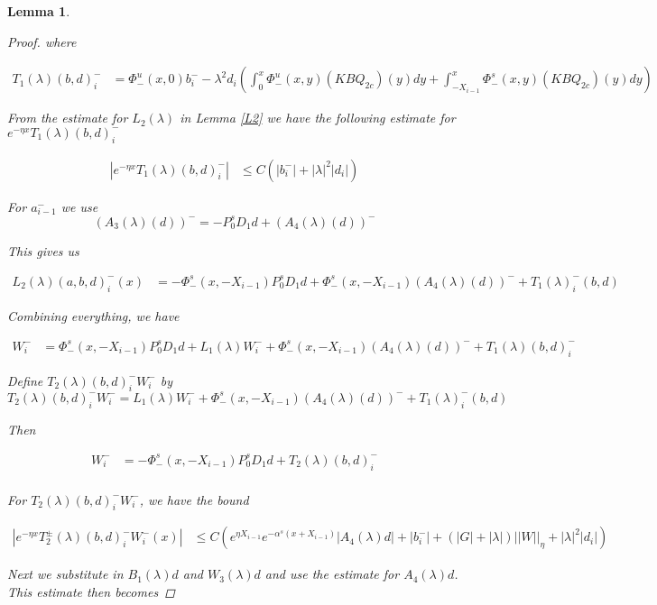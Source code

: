 \documentclass[12pt]{article}
\newtheorem{lemma}{Lemma}
\begin{document}
\begin{lemma}
\begin{proof}
where

\begin{align*}
T_1(\lambda)(b,d)_i^- &= \Phi^u_-(x, 0)b_i^- - \lambda^2 d_i \left( \int_0^x \Phi^u_-(x, y)(KBQ_{2c})(y) dy  + \int_{-X_{i-1}}^x \Phi^s_-(x, y)(KBQ_{2c})(y) dy \right)
\end{align*}


From the estimate for $L_2(\lambda)$ in Lemma \ref{L2} we have the following estimate for $ e^{-\eta x} T_1(\lambda)(b,d)_i^-$

\begin{align*}
| e^{-\eta x} T_1(\lambda)(b,d)_i^-| &\leq C \left( |b_i^-| + |\lambda|^2 |d_i| \right)
\end{align*}

For $a^-_{i-1}$ we use
\[
(A_3(\lambda)(d))^- = -P_0^s D_1 d + (A_4(\lambda)(d))^-
\]

This gives us

\begin{align*}
L_2(\lambda)(a, b, d)_i^-(x) &= -\Phi^s_-(x, -X_{i-1}) P_0^s D_1 d + \Phi^s_-(x, -X_{i-1}) (A_4(\lambda)(d))^- + T_1(\lambda)_i^-(b,d)
\end{align*}

Combining everything, we have

\begin{align*}
W_i^- &= \Phi^s_-(x, -X_{i-1}) P_0^s D_1 d + L_1(\lambda)W_i^- + \Phi^s_-(x, -X_{i-1}) (A_4(\lambda)(d))^- + T_1(\lambda)(b,d)_i^-
\end{align*}

Define $T_2(\lambda)(b,d)_i^- W_i^-$ by 
\[
T_2(\lambda)(b,d)_i^- W_i^- = L_1(\lambda) W_i^- + \Phi^s_-(x, -X_{i-1}) (A_4(\lambda)(d))^- + T_1(\lambda)_i^-(b,d)
\]

Then

\begin{align*}
W_i^- &= -\Phi^s_-(x, -X_{i-1}) P_0^s D_1 d + T_2(\lambda)(b,d)_i^-\\
\end{align*}

For $T_2(\lambda)(b,d)_i^- W_i^-$, we have the bound

\begin{align*}
|e^{-\eta x} T_2^\pm(\lambda)(b,d)_i^- W_i^-(x)| &\leq C \left( e^{\eta X_{i-1}} e^{-\alpha^s(x + X_{i-1})} |A_4(\lambda)d| + |b_i^-| + \left(|G| +|\lambda|\right)||W||_\eta + |\lambda|^2 |d_i| \right)
\end{align*}

Next we substitute in $B_1(\lambda)d$ and $W_3(\lambda)d$ and use the estimate for $A_4(\lambda)d$. This estimate then becomes


\end{proof}
\end{lemma}
\end{document}
